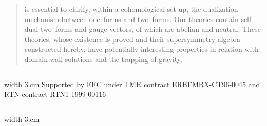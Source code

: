 \documentclass[a4paper,12pt]{article}
\begin{document}
\begin{titlepage}
\begin{abstract}
{is essential to clarify, within a cohomological set up,
the dualization mechanism between one--forms and two--forms. Our theories
contain \coordHE{} self--dual two--forms and \coordHE{} gauge vectors, \coordHE{} of which
are abelian and neutral.
These theories, whose existence is proved and their supersymmetry algebra
constructed hereby, have potentially interesting properties in relation with
domain wall solutions and the trapping of gravity.
}
\end{abstract}
\vspace{2mm} \vfill \hrule width 3.cm
{\footnotesize
 \myHighlight{$^ \dagger $}\coordHE{} \hskip 0.1cm Supported by   EEC  under TMR contract
 ERBFMRX-CT96-0045 and RTN contract RTN1-1999-00116}
\vspace{2mm} \vfill \hrule width 3.cm
\end{titlepage}
\end{document}
